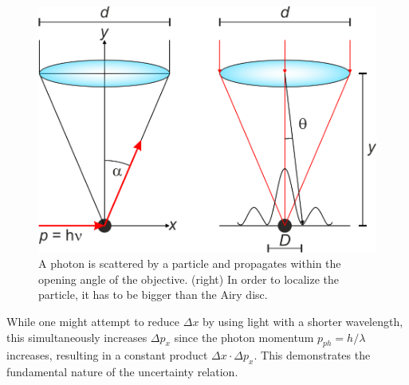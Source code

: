\documentclass[
  a4paper,
]{book}
\begin{document}
\begin{tcolorbox}
\begin{figure}[H]

{\centering \includegraphics[width=0.45\linewidth,height=\textheight,keepaspectratio]{quantum-mechanics/img/L24_uncertainty_microscope.png}

}

\caption{A photon is scattered by a particle and propagates within the
opening angle of the objective. (right) In order to localize the
particle, it has to be bigger than the Airy disc.}

\end{figure}%

While one might attempt to reduce \(\Delta x\) by using light with a
shorter wavelength, this simultaneously increases \(\Delta p_x\) since
the photon momentum \(p_{ph} = h/\lambda\) increases, resulting in a
constant product \(\Delta x \cdot \Delta p_x\). This demonstrates the
fundamental nature of the uncertainty relation.

\end{tcolorbox}
\end{document}
